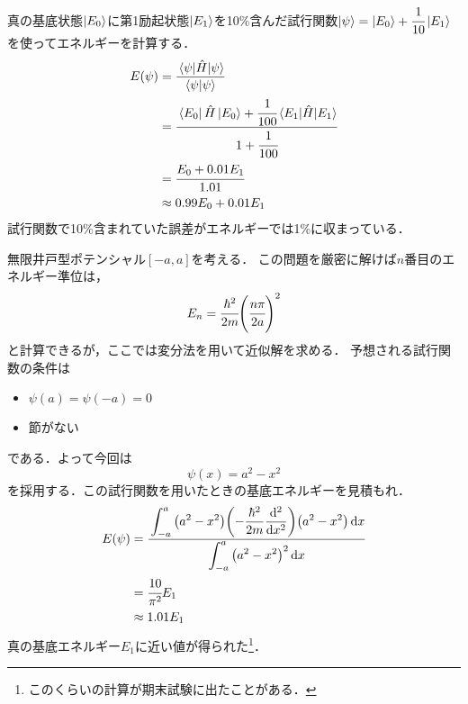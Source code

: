 \documentclass{report}
\begin{document}
  真の基底状態$\ket{E_0}$に第1励起状態$\ket{E_1}$を10\%含んだ試行関数$\ket{\psi} = \ket{E_0} + \cfrac{1}{10}\ket{E_1}$を使ってエネルギーを計算する．
  \begin{align}
    E(\psi) &= \frac{\mel{\psi}{\hat{H}}{\psi}}{\braket{\psi}} \\
    &= \cfrac{\bra{E_0}\hat{H}\ket{E_0} + \cfrac{1}{100}\mel{E_1}{\hat{H}}{E_1}}{1 + \cfrac{1}{100}} \\
    &= \cfrac{E_0 + 0.01E_1}{1.01}\\
    &\approx 0.99E_0 + 0.01E_1
  \end{align}
  試行関数で10\%含まれていた誤差がエネルギーでは1\%に収まっている．
  \begin{myex}{}{}
    無限井戸型ポテンシャル$[-a, a]$を考える．
    この問題を厳密に解けば$n$番目のエネルギー準位は，
    \begin{align}
      E_n = \cfrac{\hbar^2}{2m}\qty(\cfrac{n\pi}{2a})^2
    \end{align}
    と計算できるが，ここでは変分法を用いて近似解を求める．
    予想される試行関数の条件は
    \begin{itemize}
      \item $\psi(a) = \psi(-a) = 0$
      \item 節がない
    \end{itemize}
    である．よって今回は
    \begin{equation}
      \psi(x) = a^2 - x^2
    \end{equation}
    を採用する．この試行関数を用いたときの基底エネルギーを見積もれ．
    \tcblower
    \begin{align}
      E(\psi) &= \cfrac{\displaystyle \int_{-a}^{a}\qty(a^2 - x^2)\qty(-\frac{\hbar^2}{2m}\dv[2]{x})\qty(a^2 - x^2)\dd{x}}{\displaystyle \int_{-a}^{a}\qty(a^2 - x^2)^2\dd{x}} \\
      &= \cfrac{10}{\pi^2}E_1 \\
      &\approx 1.01E_1
    \end{align}
    真の基底エネルギー$E_1$に近い値が得られた\footnote{このくらいの計算が期末試験に出たことがある．}．
  \end{myex}
\end{document}
